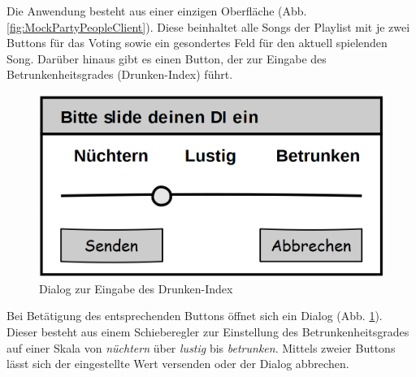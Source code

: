 Die Anwendung besteht aus einer einzigen Oberfläche (Abb. \ref{fig:MockPartyPeopleClient}). Diese beinhaltet alle Songs der Playlist mit je zwei Buttons für das Voting sowie ein gesondertes Feld für den aktuell spielenden Song. Darüber hinaus gibt es einen Button, der zur Eingabe des Betrunkenheitsgrades (Drunken-Index) führt.

\begin{figure}[H]
\centering
\includegraphics[width=0.45\linewidth]{Bilder/MockDiSlider}
\caption{Dialog zur Eingabe des Drunken-Index}
\label{fig:MockDiSlider}
\end{figure}

Bei Betätigung des entsprechenden Buttons öffnet sich ein Dialog (Abb. \ref{fig:MockDiSlider}). Dieser besteht aus einem Schieberegler zur Einstellung des Betrunkenheitsgrades auf einer Skala von \textit{nüchtern} über \textit{lustig} bis \textit{betrunken}. Mittels zweier Buttons lässt sich der eingestellte Wert versenden oder der Dialog abbrechen.